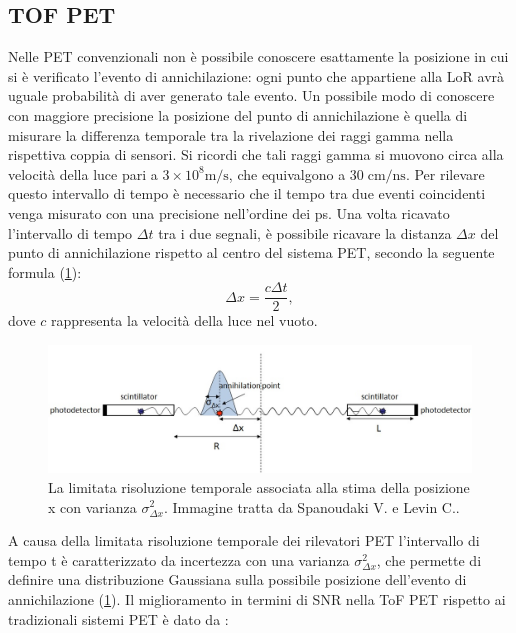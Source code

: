 \subsection{TOF PET}
Nelle PET convenzionali non è possibile conoscere esattamente la posizione in cui si è verificato l'evento di annichilazione: ogni punto che appartiene alla LoR avrà uguale probabilità di aver generato tale evento. Un possibile modo di conoscere con maggiore precisione la posizione del punto di annichilazione è quella di misurare la differenza temporale tra la rivelazione dei raggi gamma nella rispettiva coppia di sensori. Si ricordi che tali raggi gamma si muovono circa alla velocità della luce pari a $3 \times 10^8 \text{m/s}$, che equivalgono a $30  \; \text{cm/ns}$. Per rilevare questo intervallo di tempo è necessario che il tempo tra due eventi coincidenti venga misurato con una precisione nell'ordine dei \unit{\pico\second}. Una volta ricavato l'intervallo di tempo $\Delta t$ tra i due segnali, è possibile ricavare la distanza $\Delta x$ del punto di annichilazione rispetto al centro del sistema PET, secondo la seguente formula (\Fig\ref{fig:tof_distribution})\cite{Spanoudaki2010}:
\begin{equation}
	\Delta x=\frac{c\Delta t}{2},
\end{equation}
dove $c$ rappresenta la velocità della luce nel vuoto.
\begin{figure}[tbh]
	\centering
	\includegraphics[width=\linewidth]{./ImageFiles/tof_distribution.jpg}
	\caption{La limitata risoluzione temporale associata alla stima della posizione \textDelta x con varianza $\sigma^2_{\Delta x}$. Immagine tratta da Spanoudaki V. e Levin C.\cite{Spanoudaki2010}.}
	\label{fig:tof_distribution}
\end{figure}
A causa della limitata risoluzione temporale dei rilevatori PET l'intervallo di tempo \textDelta t è caratterizzato da incertezza con una varianza $\sigma^2_{\Delta x}$, che permette di definire una distribuzione Gaussiana sulla possibile posizione dell'evento di annichilazione (\Fig\ref{fig:tof_distribution}). Il miglioramento in termini di SNR nella ToF PET rispetto ai tradizionali sistemi PET è dato da \cite{Jiang2019}:
